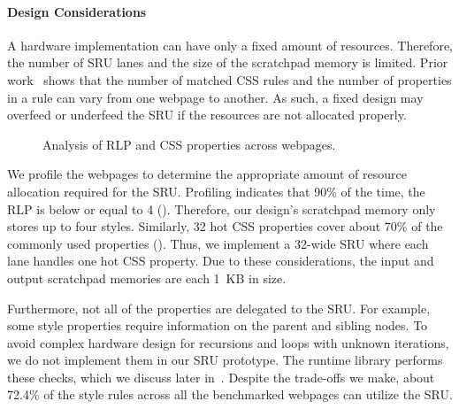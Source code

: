 
\paragraph{Design Considerations} A hardware implementation can have only a fixed amount of resources. Therefore, the number of SRU lanes and the size of the scratchpad memory is limited. Prior work~\cite{big-little} shows that the number of matched CSS rules and the number of properties in a rule can vary from one webpage to another. As such, a fixed design may overfeed or underfeed the SRU if the resources are not allocated properly.

\begin{figure}[t]
\centering
{}
\hspace*{15pt}
\caption{\small Analysis of RLP and CSS properties across webpages.}
\label{fig:para}
\end{figure}

We profile the webpages to determine the appropriate amount of resource allocation required for the SRU. Profiling indicates that 90\% of the time, the RLP is below or equal to 4 (). Therefore, our design's scratchpad memory only stores up to four styles. Similarly, 32 hot CSS properties cover about 70\% of the commonly used properties (). Thus, we implement a 32-wide SRU where each lane handles one hot CSS property. Due to these considerations, the input and output scratchpad memories are each 1~KB in size.

Furthermore, not all of the properties are delegated to the SRU. For example, some style properties require information on the parent and sibling nodes. To avoid complex hardware design for recursions and loops with unknown iterations, we do not implement them in our SRU prototype. The runtime library performs these checks, which we discuss later in~. Despite the trade-offs we make, about 72.4\% of the style rules across all the benchmarked webpages can utilize the SRU.  

